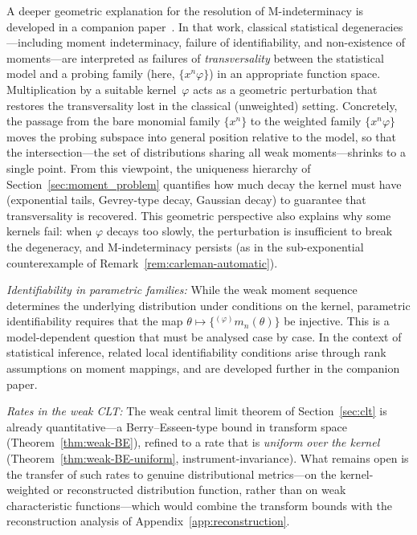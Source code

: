 \documentclass[12pt]{article}
\theoremstyle{definition}
\begin{document}
A deeper geometric explanation for the resolution of
M-indeterminacy is developed in a companion
paper~\cite{LabouriauTransversality}.  In that work, classical
statistical degeneracies---including moment indeterminacy, failure of
identifiability, and non-existence of moments---are interpreted as
failures of \emph{transversality} between the statistical model and
a probing family (here, $\{x^n\varphi\}$) in an appropriate function
space.  Multiplication by a suitable kernel~$\varphi$ acts as a
geometric perturbation that restores the transversality lost in the
classical (unweighted) setting.  Concretely, the passage from the
bare monomial family $\{x^n\}$ to the weighted family
$\{x^n\varphi\}$ moves the probing subspace into general position
relative to the model, so that the intersection---the set of
distributions sharing all weak moments---shrinks to a single point.
From this viewpoint, the uniqueness hierarchy of
Section~\ref{sec:moment_problem} quantifies how much decay the
kernel must have (exponential tails, Gevrey-type decay, Gaussian
decay) to guarantee that transversality is recovered.  This
geometric perspective also explains why some kernels fail: when
$\varphi$ decays too slowly, the perturbation is insufficient to
break the degeneracy, and M-indeterminacy persists (as in the
sub-exponential counterexample of
Remark~\ref{rem:carleman-automatic}).

\medskip

\emph{Identifiability in parametric families:}
While the weak moment sequence determines the underlying distribution under
conditions on the kernel, parametric identifiability requires that the map
$\theta\mapsto\{{}^{(\varphi)}m_n(\theta)\}$ be injective. This is a
model-dependent question that must be analysed case by case. In the context
of statistical inference, related local identifiability conditions arise
through rank assumptions on moment mappings, and are developed further in
the companion paper.

\medskip

\emph{Rates in the weak CLT:}
The weak central limit theorem of Section~\ref{sec:clt} is already
quantitative---a Berry--Esseen-type bound in transform space
(Theorem~\ref{thm:weak-BE}), refined to a rate that is \emph{uniform over the
kernel} (Theorem~\ref{thm:weak-BE-uniform}, instrument-invariance).  What
remains open is the transfer of such rates to genuine distributional
metrics---on the kernel-weighted or reconstructed distribution function,
rather than on weak characteristic functions---which would combine the
transform bounds with the reconstruction analysis of
Appendix~\ref{app:reconstruction}.
\end{document}
